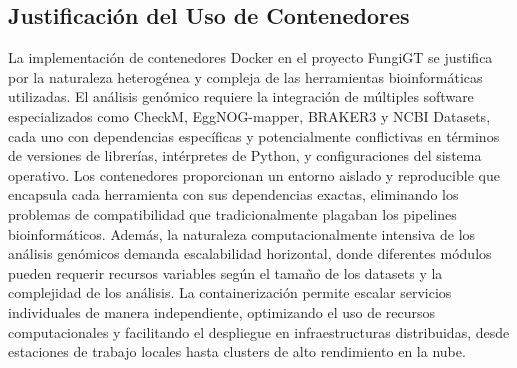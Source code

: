 \subsection{Justificación del Uso de Contenedores}

La implementación de contenedores Docker en el proyecto FungiGT se justifica por la naturaleza heterogénea y compleja de las herramientas bioinformáticas utilizadas. El análisis genómico requiere la integración de múltiples software especializados como CheckM, EggNOG-mapper, BRAKER3 y NCBI Datasets, cada uno con dependencias específicas y potencialmente conflictivas en términos de versiones de librerías, intérpretes de Python, y configuraciones del sistema operativo. Los contenedores proporcionan un entorno aislado y reproducible que encapsula cada herramienta con sus dependencias exactas, eliminando los problemas de compatibilidad que tradicionalmente plagaban los pipelines bioinformáticos. Además, la naturaleza computacionalmente intensiva de los análisis genómicos demanda escalabilidad horizontal, donde diferentes módulos pueden requerir recursos variables según el tamaño de los datasets y la complejidad de los análisis. La containerización permite escalar servicios individuales de manera independiente, optimizando el uso de recursos computacionales y facilitando el despliegue en infraestructuras distribuidas, desde estaciones de trabajo locales hasta clusters de alto rendimiento en la nube. 